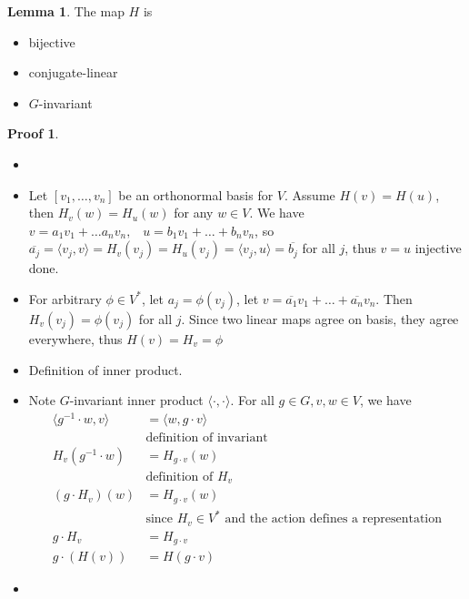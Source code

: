 \documentclass{book}
\newcommand{\inner}[1]{\langle #1 \rangle}
\theoremstyle{definition}
\newtheorem{lemma}{Lemma}[chapter]
\theoremstyle{remarkstyle}
\newtheorem*{myproof}{Proof}%
\begin{document}
\begin{lemma}
    The map $H$ is 
    \begin{itemize}
        \item bijective
        \item conjugate-linear
        \item $G$-invariant
    \end{itemize}
\end{lemma}
\begin{myproof}
    \begin{itemize}
        \item[]
        \item Let $[v_1,\dots,v_n]$ be an orthonormal basis for $V$. Assume $H(v) = H(u)$, then $H_v(w) = H_u(w)$ for any $w\in V$. We have $v=a_1v_1+\dots a_nv_n,\;\;\; u=b_1v_1+\dots+b_nv_n$, so $\overline{a_j}=\inner{v_j,v}=H_v(v_j)=H_u(v_j)=\inner{v_j,u}=\overline{
        b_j}$ for all $j$, thus $v=u$ injective done.
        \item For arbitrary $\phi\in V^*$, let $a_j=\phi(v_j)$, let $v=\overline{a_1}v_1+\dots+\overline{a_n}v_n$. Then $H_v(v_j)=\phi(v_j)$ for all $j$. Since two linear maps agree on basis, they agree everywhere, thus $H(v)=H_v=\phi$
        \item Definition of inner product.
        \item Note $G$-invariant inner product $\inner{\cdot,\cdot}$. For all $g\in G, v,w\in V$, we have
        \begin{align*}
            \inner{g^{-1}\cdot w,v} &= \inner{w,g\cdot v} \\
            &\textrm{definition of invariant} \\
            H_v(g^{-1} \cdot w) &= H_{g\cdot v}(w)\\
            &\textrm{definition of $H_v$} \\
            (g\cdot H_v)(w) &= H_{g\cdot v}(w) \\
            &\textrm{since $H_v\in V^*$ and the action defines a representation} \\
            g\cdot H_v &= H_{g\cdot v} \\
            g\cdot (H(v)) &= H(g\cdot v)
        \end{align*}
        \item[] 
    \end{itemize}
\end{myproof}
\end{document}
